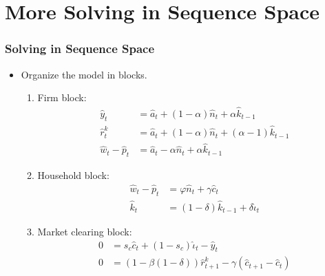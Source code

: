 \documentclass[english,xcolor=svgnames]{beamer}
\begin{document}
\section{More Solving in Sequence Space}

\begin{frame}
    \frametitle{Solving in Sequence Space}
		\begin{itemize}
			\item Organize the model in blocks.
			\begin{enumerate}
				\item Firm block:
				\begin{align*}
					\hat{y}_t&=\hat{a}_t + (1-\alpha)\hat{n}_{t} +\alpha \hat{k}_{t-1} \\
					\hat{r}_t^k&=\hat{a}_t + (1-\alpha)\hat{n}_{t} +(\alpha-1) \hat{k}_{t-1} \\
					\hat{w}_t - \hat{p}_t &= \hat{a}_t -\alpha\hat{n}_{t} +\alpha \hat{k}_{t-1} 
				\end{align*}
				\item Household block:
				\begin{align*}
					\hat{w}_t - \hat{p}_t &=\varphi \hat{n}_t + \gamma \hat{c}_t \\
					\hat{k}_t &= (1-\delta)\hat{k}_{t-1} + \delta\hat{\iota}_t
				\end{align*}
				\item Market clearing block:
				\begin{align*}
					0&=s_c\hat{c}_t + (1-s_c)\hat{\iota}_t -\hat{y}_t \\
					0&= (1-\beta(1-\delta))\hat{r}_{t+1}^k -  \gamma (\hat{c}_{t+1} - \hat{c}_{t}) \\
				\end{align*}
			\end{enumerate}
		\end{itemize}
		
\end{frame}
\end{document}
